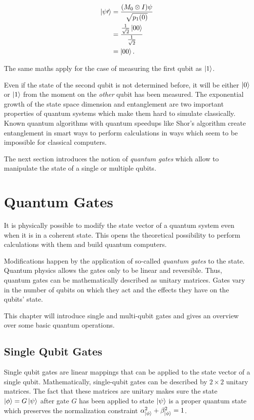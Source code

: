 \begin{align}
  \Ket{\psi\prime} &= \frac{(M_0 \otimes I) \psi}{\sqrt{p_1(0)}} \\
                   &= \frac{\frac{1}{\sqrt{2}} \Ket{00}}{\frac{1}{\sqrt{2}}} \\
                   &= \Ket{00}.
\end{align}

The same maths apply for the case of measuring the first qubit as $\Ket{1}$.

Even if the state of the second qubit is not determined before, it will be
either $\Ket{0}$ or $\Ket{1}$ from the moment on the \textit{other} qubit has been measured.
The exponential growth of the state space dimension and entanglement are two
important properties of quantum systems which make them hard to simulate
classically.
Known quantum algorithms with quantum speedups like Shor's algorithm
create entanglement in smart ways to perform calculations in ways which seem
to be impossible for classical computers.

The next section introduces the notion of \textit{quantum gates} which allow to
manipulate the state of a single or multiple qubits.

\section{Quantum Gates}

It is physically possible to modify the state vector of a quantum system even
when it is in a coherent state. This opens the theoretical possibility to perform
calculations with them and build quantum computers.

Modifications happen by the application of so-called \textit{quantum gates} to
the state. Quantum physics allows the gates only to be linear and reversible. Thus,
quantum gates can be mathematically described as unitary matrices. Gates vary in the number of
qubits on which they act and the effects they have on the qubits' state.

This chapter will introduce single and multi-qubit gates and gives an overview
over some basic quantum operations.

\subsection{Single Qubit Gates}

Single qubit gates are linear mappings that can be applied to the state vector
of a single qubit. Mathematically, single-qubit gates can be described by $2
\times 2$ unitary matrices. The fact that these matrices are unitary makes sure
the state $\Ket{\phi} = G \Ket{\psi}$ after gate $G$ has been applied to state $\Ket{\psi}$ is a
proper quantum state which preserves the normalization constraint
$\alpha_{\Ket{\phi}}^2 + \beta_{\Ket{\phi}}^2 = 1$.

